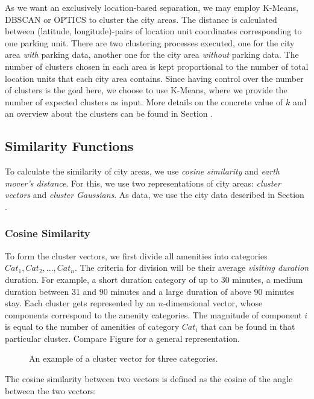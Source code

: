 As we want an exclusively location-based separation, we may employ K-Means, DBSCAN or OPTICS to cluster the city areas. The distance is calculated between (latitude, longitude)-pairs of location unit coordinates corresponding to one parking unit. There are two clustering processes executed, one for the city area \textit{with} parking data, another one for the city area \textit{without} parking data. The number of clusters chosen in each area is kept proportional to the number of total location units that each city area contains. Since having control over the number of clusters is the goal here, we choose to use K-Means, where we provide the number of expected clusters as input. More details on the concrete value of $k$ and an overview about the clusters can be found in Section .

\subsection{Similarity Functions}
\label{realization:similarity_functions}
To calculate the similarity of city areas, we use \textit{cosine similarity} and \textit{earth mover's distance}. For this, we use two representations of city areas: \textit{cluster vectors} and \textit{cluster Gaussians}. As data, we use the city data described in Section .

\subsubsection{Cosine Similarity}
\label{realization:vectors}
To form the cluster vectors, we first divide all amenities into categories $Cat_1, Cat_2, ..., Cat_n$.
The criteria for division will be their average \textit{visiting duration} duration.
For example, a short duration category of up to 30 minutes, a medium duration between 31 and 90 minutes and a large duration of above 90 minutes stay.
Each cluster gets represented by an $n$-dimensional vector, whose components correspond to the amenity categories.
The magnitude of component $i$ is equal to the number of amenities of category $Cat_i$ that can be found in that particular cluster.
Compare Figure  for a general representation.

\begin{figure}[!ht]
	\centering
	
	\caption{An example of a cluster vector for three categories.}
	\label{fig:cluster_vector}
\end{figure}
The cosine similarity between two vectors is defined as the cosine of the angle between the two vectors:


